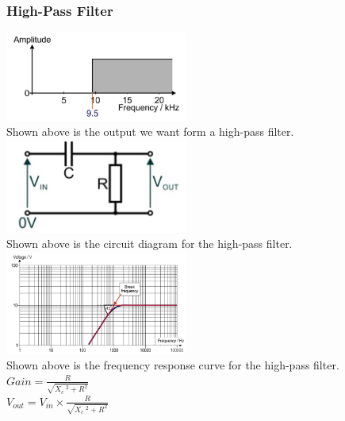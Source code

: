 \documentclass[a4paper,11pt, twocolumn]{article}
\begin{document}
\subsubsection{High-Pass Filter}
\includegraphics[width=0.45\textwidth]{hpfBasicGraph.jpg}\\
Shown above is the output we want form a high-pass filter.
\includegraphics[width=0.45\textwidth]{hpfCircuit.jpg}\\
Shown above is the circuit diagram for the high-pass filter.\\
\includegraphics[width=0.45\textwidth]{hpfFreqResp.jpg} \\
Shown above is the frequency response curve for the high-pass filter.\\
$\displaystyle Gain = \frac{R}{\sqrt{X_c\ ^2 + R^2}}$\\
$\displaystyle V_{out} = V_{in} \times \frac{R}{\sqrt{X_c\ ^2 + R^2}}$
\end{document}
